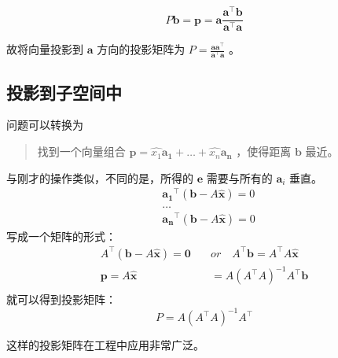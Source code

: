 $$
P\mathbf b=\mathbf p=\mathbf a\frac{\mathbf a^\top\mathbf b}{\mathbf a^\top\mathbf a}
$$

故将向量投影到 $\mathbf a$ 方向的投影矩阵为 $P=\frac{\mathbf a\mathbf a^\top}{\mathbf a^\top\mathbf a}$ 。

\subsection{投影到子空间中}

问题可以转换为
\begin{quote}
	找到一个向量组合 $\mathbf p=\hat{x_1}\mathbf{a_1}+\dots+\hat{x_n}\mathbf{a_n}$ ，使得距离 $\mathbf b$ 最近。
\end{quote}

与刚才的操作类似，不同的是，所得的 $\mathbf e$ 需要与所有的 $\mathbf a_i$ 垂直。
$$
\begin{aligned}
&\mathbf {a_1}^\top(\mathbf b-A\hat{\mathbf x})=0\\
&\dots\\
&\mathbf {a_n}^\top(\mathbf b-A\hat{\mathbf x})=0
\end{aligned}
$$
写成一个矩阵的形式：
$$
\begin{aligned}
A^\top(\mathbf b-A\hat{\mathbf x})=\mathbf 0\quad& or\quad 
A^\top\mathbf b=A^\top A\hat{\mathbf x}\\
\mathbf p=A\hat{\mathbf x}&=A(A^\top A)^{-1}A^\top\mathbf b\\
\end{aligned}
$$
就可以得到投影矩阵：
$$
P=A(A^\top A)^{-1}A^\top
$$

这样的投影矩阵在工程中应用非常广泛。